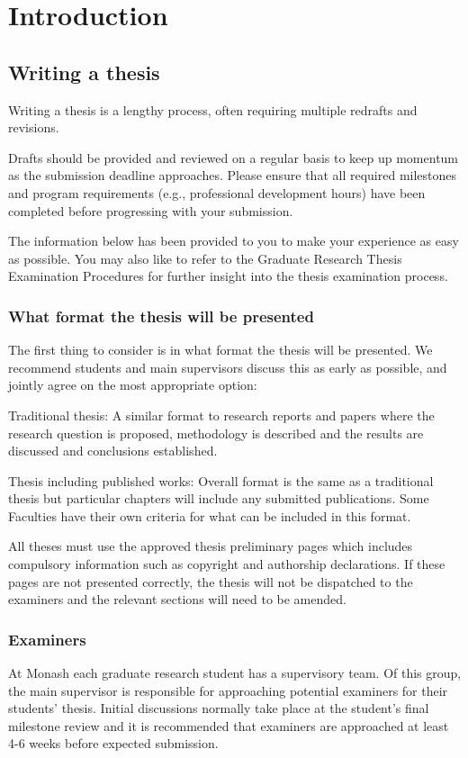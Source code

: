 \chapter{Introduction}

\section{Writing a thesis}
Writing a thesis is a lengthy process, often requiring multiple redrafts and revisions.

Drafts should be provided and reviewed on a regular basis to keep up momentum as the submission deadline approaches. Please ensure that all required milestones and program requirements (e.g., professional development hours) have been completed before progressing with your submission.

The information below has been provided to you to make your experience as easy as possible. You may also like to refer to the Graduate Research Thesis Examination Procedures for further insight into the thesis examination process.

\subsection{What format the thesis will be presented}
The first thing to consider is in what format the thesis will be presented.
We recommend students and main supervisors discuss this as early as possible, and jointly agree on the most appropriate option:

Traditional thesis: A similar format to research reports and papers where the research question is proposed, methodology is described and the results are discussed and conclusions established.

Thesis including published works: Overall format is the same as a traditional thesis but particular chapters will include any submitted publications. Some Faculties have their own criteria for what can be included in this format.

All theses must use the approved thesis preliminary pages which includes compulsory information such as copyright and authorship declarations. If these pages are not presented correctly, the thesis will not be dispatched to the examiners and the relevant sections will need to be amended.

\subsection{Examiners}
At Monash each graduate research student has a supervisory team. Of this group, the main supervisor is responsible for approaching potential examiners for their students' thesis. Initial discussions normally take place at the student's final milestone review and it is recommended that examiners are approached at least 4-6 weeks before expected submission.

